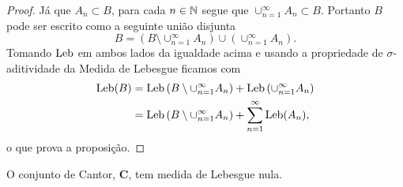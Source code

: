         \begin{proof}
            Já que $A_n\subset B$, para cada $n\in\mathbb{N}$ segue que 
            $\cup_{n=1}^{\infty}A_n\subset B$. Portanto $B$ pode ser escrito como a seguinte união disjunta
            \[
                B 
                = 
                \left( B\setminus \cup_{n=1}^{\infty} A_n\right)
                \cup
                \left(\cup_{n=1}^{\infty} A_n\right).
            \]
            Tomando $\mathrm{Leb}$ em ambos lados da igualdade
            acima e usando a propriedade de $\sigma$-aditividade
            da Medida de Lebesgue ficamos com 
            \begin{align*}
                \mathrm{Leb}(B) 
                &= 
                \mathrm{Leb}\left( B\setminus \cup_{n=1}^{\infty} A_n\right)
                +
                \mathrm{Leb}\left(\cup_{n=1}^{\infty} A_n\right)
                \\
                &=
                \mathrm{Leb}\left( B\setminus \cup_{n=1}^{\infty} A_n\right)
                +
                \sum_{n=1}^{\infty}\mathrm{Leb} (A_n),
            \end{align*}
            o que prova a proposição.
        \end{proof}
        \begin{proposicao}
        \label{cantor-medida-nula}
            O conjunto de Cantor, $\mathbf{C}$, tem medida de Lebesgue nula.
        \end{proposicao}
